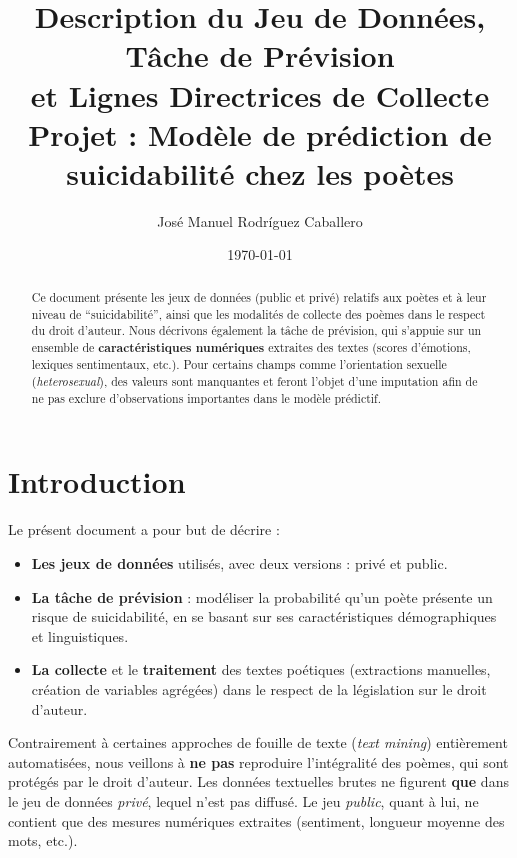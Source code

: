 \documentclass[12pt,a4paper]{article}
\title{Description du Jeu de Données, Tâche de Prévision \\
	et Lignes Directrices de Collecte \\
	\large{Projet : Modèle de prédiction de suicidabilité chez les poètes}}
\author{José Manuel Rodríguez Caballero}
\date{\today}
\begin{document}
	
	\maketitle
	\onehalfspacing
	
	\begin{abstract}
		Ce document présente les jeux de données (public et privé) relatifs aux poètes 
		et à leur niveau de ``suicidabilité'', ainsi que les modalités de collecte des 
		poèmes dans le respect du droit d'auteur. Nous décrivons également la tâche de 
		prévision, qui s'appuie sur un ensemble de \textbf{caractéristiques numériques} 
		extraites des textes (scores d'émotions, lexiques sentimentaux, etc.). Pour 
		certains champs comme l’orientation sexuelle (\textit{heterosexual}), des valeurs 
		sont manquantes et feront l’objet d’une imputation afin de ne pas exclure 
		d’observations importantes dans le modèle prédictif.
	\end{abstract}
	
	\section{Introduction}
	\label{sec:intro}
	
	Le présent document a pour but de décrire :
	\begin{itemize}
		\item \textbf{Les jeux de données} utilisés, avec deux versions : privé et public.
		\item \textbf{La tâche de prévision} : modéliser la probabilité qu’un poète 
		présente un risque de suicidabilité, en se basant sur ses caractéristiques 
		démographiques et linguistiques.
		\item \textbf{La collecte} et le \textbf{traitement} des textes poétiques 
		(extractions manuelles, création de variables agrégées) dans le respect 
		de la législation sur le droit d'auteur.
	\end{itemize}
	
	Contrairement à certaines approches de fouille de texte (\textit{text mining}) 
	entièrement automatisées, nous veillons à \textbf{ne pas} reproduire l’intégralité 
	des poèmes, qui sont protégés par le droit d’auteur. Les données textuelles brutes 
	ne figurent \textbf{que} dans le jeu de données \textit{privé}, lequel n'est pas 
	diffusé. Le jeu \textit{public}, quant à lui, ne contient que des mesures numériques 
	extraites (sentiment, longueur moyenne des mots, etc.).
	
\end{document}
